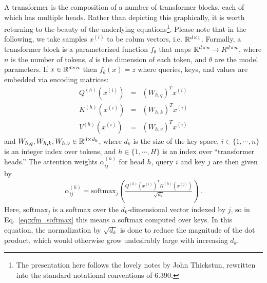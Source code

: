 %
%
%
A transformer is the composition of a number of transformer blocks, each of which has multiple heads.  Rather than depicting this graphically, it is worth returning to the beauty of the underlying equations\footnote{The presentation here follows the lovely notes by John Thickstun, rewritten into the standard notational conventions of 6.390.}.  Please note that in the following, we take samples $x^{(i)}$ to be colum vectors, i.e. $\mathbb{R}^{d \times 1}$.
%
Formally, a transformer block is a parameterized function $f_\theta$ that maps $\mathbb{R}^{d\times n}\rightarrow R^{d\times n}$, where $n$ is the number of tokens, $d$ is the dimension of each token, and $\theta$ are the model parameters.  If $x\in \mathbb{R}^{d\times n}$ then $f_\theta(x) = z$ where queries, keys, and values are embedded via encoding matrices:
\begin{eqnarray}
  Q^{(h)}(x^{(i)}) &=& (W_{h,q})^T x^{(i)}
  \\
  K^{(h)}(x^{(i)}) &=& (W_{h,k})^T x^{(i)}
  \\
  V^{(h)}(x^{(i)}) &=& (W_{h,v})^T x^{(i)}
\end{eqnarray}
and $W_{h,q}, W_{h,k}, W_{h,v} \in \mathbb{R}^{d\times d_k}$, where $d_k$ is the size of the key space, $i \in \{1,\cdots,n\}$ is an integer index over tokens, and $h \in \{1,\cdots,H\}$ is an index over ``transformer heads.''  The attention weights $\alpha^{(h)}_{ij}$ for head $h$, query $i$ and key $j$ are then given by
\begin{eqnarray}
  \alpha^{(h)}_{ij} = \text{softmax}_j \left( \frac{Q^{(h)}(x^{(i)})^T K^{(h)}(x^{(j)})}{\sqrt{d_k}}  \right)
  \,.
  \label{eq:xfm_softmax}
\end{eqnarray}
Here, $\text{softmax}_j$ is a softmax over the $d_k$-dimensional vector indexed by $j$, so in Eq.~\ref{eq:xfm_softmax} this means a softmax computed over keys.  In this equation, the normalization by $\sqrt{d_k}$ is done to reduce the magnitude of the dot product, which would otherwise grow undesirably large with increasing $d_k$.

